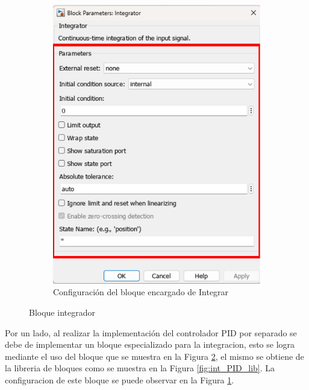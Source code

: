 \begin{figure}[htbp]
\begin{subfigure}[b]{0.45\textwidth}
        \includegraphics[width=\textwidth]{fig/Capitulo5/Caso_de_estudio_PID/config_integrator.pdf}
        \caption{Configuración del bloque encargado de Integrar}
        \label{fig:int_conf_PID}
    \end{subfigure}
    \caption{Bloque integrador}
    \label{fig:int_block}
\end{figure}

Por un lado, al realizar la implementación del controlador PID por separado se debe de implementar un bloque especializado para la integracion, esto se logra mediante el uso del bloque que se muestra en la Figura \ref{fig:int_block}, el mismo se obtiene de la libreria de bloques como se muestra en la Figura \ref{fig:int_PID_lib}. La configuracion de este bloque se puede observar en la Figura \ref{fig:int_conf_PID}.

\newpage

